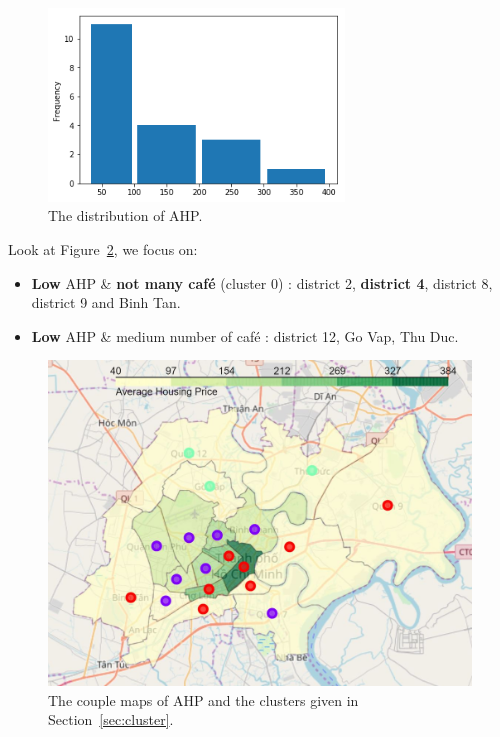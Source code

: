 \documentclass[12pt,a4paper]{article}
\begin{document}
\begin{center}
    \begin{figure}[htp]
    \begin{center}
     \includegraphics[width=0.7\textwidth]{fig/ahp}
    \end{center}
    \caption{The distribution of AHP.}
    \label{fig:ahp}
    \end{figure}
\end{center}

Look at Figure~\ref{fig:ahp_cluster}, we focus on: 

\begin{itemize}
\item \textbf{Low} AHP \& \textbf{not many café} (cluster 0) : district 2, \textbf{district 4}, district 8, district 9 and Binh Tan.
\item \textbf{Low} AHP \& medium number of café : district 12, Go Vap, Thu Duc.
\end{itemize}

\begin{center}
    \begin{figure}[htp]
    \begin{center}
     \includegraphics[width=\textwidth]{fig/ahp_cluster}
    \end{center}
    \caption{The couple maps of AHP and the clusters given in Section~\ref{sec:cluster}.}
    \label{fig:ahp_cluster}
    \end{figure}
\end{center}
\end{document}
